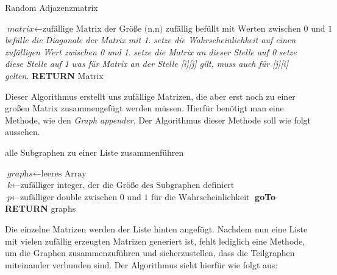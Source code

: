 \begin{algorithm}
\caption{Random Adjazenzmatrix}\label{randomAdjacency}
\begin{algorithmic}[1]
\State $\textit{matrix} \gets \text{zufällige Matrix der Größe (n,n) zufällig befüllt mit Werten zwischen 0 und 1}$
\State \textit{befülle die Diagonale der Matrix mit 1}.
\EndFor
{}
\State \textit{setze die Wahrscheinlichkeit auf einen zufälligen Wert zwischen 0 und 1}.
\State \textit{setze die Matrix an dieser Stelle auf 0}
\Else 
\State \textit{setze diese Stelle auf 1}
\EndIf
\EndFor
{}
\State \textit{was für Matrix an der Stelle [i][j] gilt, muss auch für [j][i] gelten}.
\State \textbf{RETURN} Matrix
\EndFor
\EndProcedure
\end{algorithmic}
\end{algorithm}

Dieser Algorithmus erstellt uns zufällige Matrizen, die aber erst noch zu einer großen Matrix zusammengefügt werden müssen. Hierfür benötigt man eine Methode, wie den \textit{Graph appender}. Der Algorithmus dieser Methode soll wie folgt aussehen. 

\begin{algorithm}
\caption{alle Subgraphen zu einer Liste zusammenführen}\label{GraphAppender}
\begin{algorithmic}[1]
\State $\textit{graphs} \gets \text{leeres Array}$
\State $\textit{k} \gets \text{zufälliger integer, der die Größe des Subgraphen definiert}$
\State $\textit{p} \gets \text{zufälliger double zwischen 0 und 1 für die Wahrscheinlichkeit}$
\State \textbf{goTo} 
\State {} \textbf{RETURN} graphs 
\EndFor
\EndProcedure
\end{algorithmic}
\end{algorithm}

\newpage
Die einzelne Matrizen werden der Liste hinten angefügt.
Nachdem nun eine Liste mit vielen zufällig erzeugten Matrizen generiert ist, fehlt lediglich eine Methode, um die Graphen zusammenzuführen und sicherzustellen, dass die Teilgraphen miteinander verbunden sind. Der Algorithmus sieht hierfür wie folgt aus:


